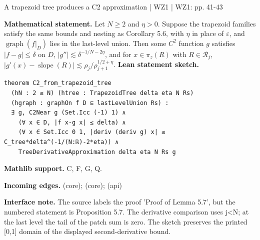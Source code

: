 \documentclass[10pt,a4paper]{article}
\newcommand{\nodecard}[1]{\hyperlink{node-#1}{\texttt{\detokenize{#1}}}}
\begin{document}
\begin{minipage}{\linewidth}
\hypertarget{node-P5_7}{}
\begin{tcolorbox}[colback=white,colframe=regularityfg,colbacktitle=regularitybg,coltitle=ink,boxrule=0.45pt,arc=1.6mm,left=3mm,right=3mm,top=2mm,bottom=2mm,title={\sffamily\bfseries WZ1 Proposition 5.7 \hfill \texttt{P5\_7}}]
{\sffamily\small\color{muted}A trapezoid tree produces a C2 approximation | WZ1 | WZ1: pp. 41-43}\par
\textbf{Mathematical statement.} Let $N\ge2$ and $\eta>0$. Suppose the trapezoid families satisfy the same bounds and nesting as Corollary 5.6, with $\eta$ in place of $\varepsilon$, and $\operatorname{graph}(f|_D)$ lies in the last-level union.
Then some $C^2$ function $g$ satisfies $|f-g|\le\delta$ on $D$,
$|g''|\lesssim\delta^{-1/N-2\eta}$, and for $x\in\pi_z(R)$ with $R\in\mathcal R_j$,
$|g'(x)-\operatorname{slope}(R)|\lesssim\rho_j/\rho_{j+1}^{1/2+\eta}$.
\smallskip\textbf{Lean statement sketch.}
\begin{Verbatim}[fontsize=\small,breaklines=true,breakanywhere=true,tabsize=2]
theorem C2_from_trapezoid_tree
  (hN : 2 ≤ N) (htree : TrapezoidTree delta eta N Rs)
  (hgraph : graphOn f D ⊆ lastLevelUnion Rs) :
  ∃ g, C2Near g (Set.Icc (-1) 1) ∧
    (∀ x ∈ D, |f x-g x| ≤ delta) ∧
    (∀ x ∈ Set.Icc 0 1, |deriv (deriv g) x| ≤ C_tree*delta^(-1/(N:ℝ)-2*eta)) ∧
    TreeDerivativeApproximation delta eta N Rs g
\end{Verbatim}
{\footnotesize\textbf{Mathlib support.} C, F, G, Q.\par
\textbf{Incoming edges.} \nodecard{L5_8} (core); \nodecard{Dtrap} (core); \nodecard{Icalc} (api)\par}
{\footnotesize\textbf{Interface note.} The source labels the proof 'Proof of Lemma 5.7', but the numbered statement is Proposition 5.7. The derivative comparison uses j<N; at the last level the tail of the patch sum is zero. The sketch preserves the printed [0,1] domain of the displayed second-derivative bound.}
\end{tcolorbox}\end{minipage}\par\medskip
\end{document}
